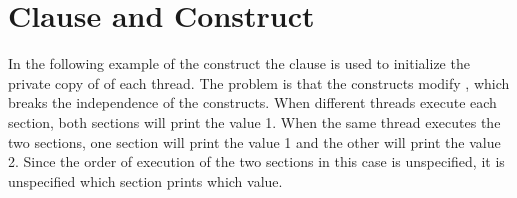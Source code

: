 \pagebreak
\section{ Clause and  Construct}
\label{sec:fpriv_sections}

In the following example of the  construct  the  
clause is used to initialize the private copy of  of each 
thread. The problem is that the  constructs modify , 
which breaks the independence of the  constructs. When different 
threads execute each section, both sections will print the value 1. When the same 
thread executes the two sections, one section will print the value 1 and the other 
will print the value 2. Since the order of execution of the two sections in this 
case is unspecified, it is unspecified which section prints which value. 





